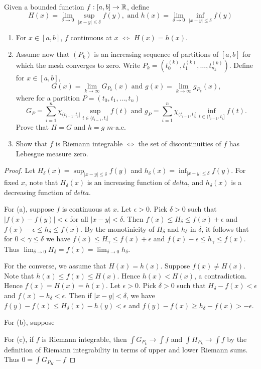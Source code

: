 \documentclass{article}
\begin{document}
 Given a bounded function $f : [a,b] \to \mathbb{R}$, define
$$ H(x) = \lim_{\delta \to 0} \sup_{|x - y| \le \delta} f(y), \text{ and } h(x) = \lim_{\delta \to 0} \inf_{|x - y| \le \delta} f(y)$$
\begin{enumerate}[\bfseries a)]
\item For $x \in [a,b]$, $f$ continuous at $x$ $\iff$ $H(x) = h(x)$.
\item Assume now that $(P_k)$ is an increasing sequence of partitions of $[a,b]$ for which the mesh converges to zero. Write $P_k = (t_0^{(k)}, t_1^{(k)}, \ldots, t_{n_k}^{(k)})$. Define for $x \in [a,b]$,
$$G(x) = \lim_{k \to \infty} G_{P_k}(x) \text{ and } g(x) = \lim_{k \to \infty} g_{P_k}(x),$$
where for a partition $P = (t_0, t_1, \ldots, t_n)$
$$G_P = \sum_{i=1}^n \chi_{(t_{i-1}, t_i]} \sup_{t \in (t_{i-1}, t_i]} f(t) \text{ and } g_P = \sum_{i=1}^n \chi_{(t_{i-1}, t_i]} \inf_{t \in (t_{i-1}, t_i]} f(t).$$
Prove that $H = G$ and $h = g$ $m$-a.e.
\item Show that $f$ is Riemann integrable $\iff$ the set of discontinuities of $f$ has Lebesgue measure zero.
\end{enumerate}

\begin{proof}
Let $H_\delta(x) = \sup_{|x - y| \le \delta} f(y)$ and $h_\delta(x) = \inf_{|x - y| \le \delta} f(y)$. For fixed $x$, note that $H_\delta(x)$ is an increasing function of $delta$, and $h_\delta(x)$ is a decreasing function of $delta$.

For (a), suppose $f$ is continuous at $x$. Let $\epsilon > 0$. Pick $\delta > 0$ such that $|f(x) - f(y)| < \epsilon$ for all $|x - y| < \delta$.  Then $f(x) \le H_\delta \le f(x) + \epsilon$ and $f(x) - \epsilon \le h_\delta \le f(x)$.  By the monotinicity of $H_\delta$ and $h_\delta$ in $\delta$, it follows that for $0 < \gamma \le  \delta$ we have $f(x) \le H_\gamma \le f(x) + \epsilon$ and $f(x) - \epsilon \le h_\gamma \le f(x)$.  Thus $\lim_{\delta \to 0} H_\delta = f(x) = \lim_{\delta \to 0} h_\delta$.

For the converse, we assume that $H(x) = h(x)$.  Suppose $f(x) \neq H(x)$.  Note that $h(x) \le f(x) \le H(x)$.  Hence $h(x) < H(x)$, a contradiction.  Hence $f(x) = H(x) = h(x)$.  Let $\epsilon > 0$.  Pick $\delta > 0$ such that $H_\delta - f(x) < \epsilon$ and $f(x) - h_\delta < \epsilon$. Then if $|x - y| < \delta$, we have $f(y) - f(x) \le H_\delta(x) - h(y) < \epsilon$ and $f(y) - f(x) \ge h_\delta - f(x) > - \epsilon$.

For (b), suppose

For (c), if $f$ is Riemann integrable, then $\int G_{P_k} \to \int f$ and $\int H_{P_k} \to \int f$ by the definition of Riemann integrability in terms of upper and lower Riemann sums.  Thus $0  = \int G_{P_K} - f $

\end{proof}
\end{document}
